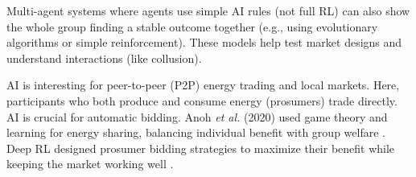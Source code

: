 \documentclass[conference]{IEEEtran}
\begin{document}
Multi-agent systems where agents use simple AI rules (not full RL) can also show the whole group finding a stable outcome together (e.g., using evolutionary algorithms or simple reinforcement). These models help test market designs and understand interactions (like collusion).

AI is interesting for peer-to-peer (P2P) energy trading and local markets. Here, participants who both produce and consume energy (prosumers) trade directly. AI is crucial for automatic bidding. Anoh \textit{et al.} (2020) used game theory and learning for energy sharing, balancing individual benefit with group welfare \cite{Anoh2020}. Deep RL designed prosumer bidding strategies to maximize their benefit while keeping the market working well \cite{Hosseini2020, Noor2021}.

\end{document}
